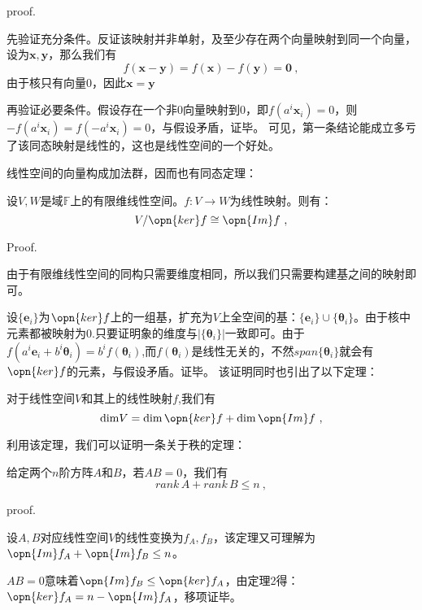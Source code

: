 proof.

先验证充分条件。反证该映射并非单射，及至少存在两个向量映射到同一个向量，设为$\boldsymbol{x,y}$，那么我们有
\begin{equation}
f(\boldsymbol{x}-\boldsymbol{y})=f(\boldsymbol x)-f(\boldsymbol y)=\boldsymbol 0~,
\end{equation}
由于核只有向量$0$，因此$\boldsymbol {x}=\boldsymbol{y}$

再验证必要条件。假设存在一个非$0$向量映射到$0$，即$f(a^i\boldsymbol x_i)=0$，则$-f(a^i\boldsymbol x_i)=f(-a^i\boldsymbol x_i)=0$，与假设矛盾，证毕。
可见，第一条结论能成立多亏了该同态映射是线性的，这也是线性空间的一个好处。

线性空间的向量构成加法群，因而也有同态定理：
\begin{theorem}{}
设$V,W$是域$\mathbb F$上的有限维线性空间。$f:V\rightarrow W$为线性映射。则有：
\begin{equation}
V/\opn{ker}f\cong \opn{Im} f~,
\end{equation}
\end{theorem}
Proof.

由于有限维线性空间的同构只需要维度相同，所以我们只需要构建基之间的映射即可。

设$\{\boldsymbol e_i\}$为$\opn{ker}f$上的一组基，扩充为$V$上全空间的基：$\{\boldsymbol e_i\}\cup \{\boldsymbol \theta_i\}$。由于核中元素都被映射为0.只要证明象的维度与$|\{\boldsymbol \theta_i\}|$一致即可。由于$f(a^i\boldsymbol e_i+b^i\boldsymbol \theta_i)=b^if(\boldsymbol \theta_i)$,而$f(\boldsymbol \theta_i)$是线性无关的，不然$span\{\boldsymbol \theta_i\}$就会有$\opn{ker}f$的元素，与假设矛盾。证毕。
该证明同时也引出了以下定理：
\begin{lemma}{}
对于线性空间$V$和其上的线性映射$f$,我们有
\begin{equation}
\mathrm{dim}V=\mathrm{dim}\,\opn{ker}f+\mathrm {dim}\,\opn{Im}f~,
\end{equation}
\end{lemma}
利用该定理，我们可以证明一条关于秩的定理：
\begin{theorem}{}
给定两个$n$阶方阵$A$和$B$，若$AB=0$，我们有
\begin{equation}
rank\,A+rank\,B\le n~,
\end{equation}
\end{theorem}
proof.

设$A,B$对应线性空间$V$的线性变换为$f_A,f_B$，该定理又可理解为$\opn{Im}f_A+\opn{Im}f_B\le n$。

$AB=0$意味着$\opn{Im}f_B\le \opn{ker}f_A$，由定理2得：$\opn{ker}f_A=n-\opn{Im}f_A$，移项证毕。
